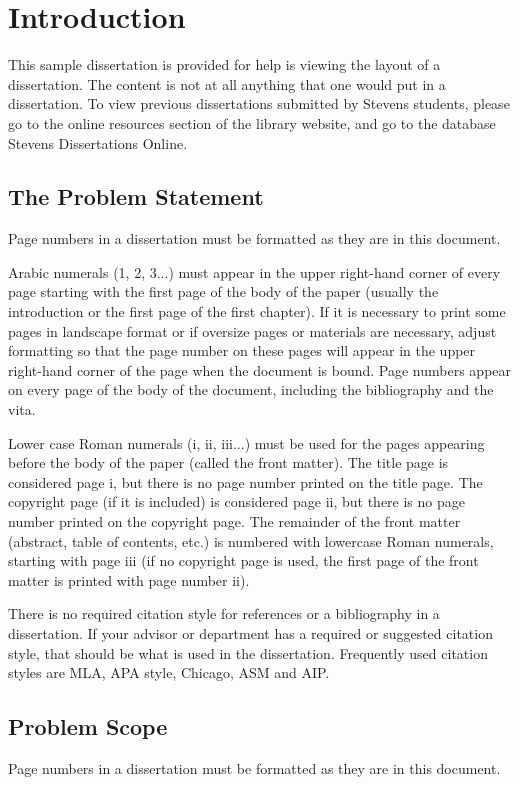 
\chapter{Introduction}
This sample dissertation is provided for help is viewing the layout of a dissertation.  The content is not at all anything that one would put in a dissertation.  To view previous dissertations submitted by Stevens students, please go to the online resources section of the library website, and go to the database Stevens Dissertations Online.  

\section{The Problem Statement}    
Page numbers in a dissertation must be formatted as they are in this document.  

Arabic numerals (1, 2, 3...) must appear in the upper right-hand corner of every page starting with the first page of the body of the paper (usually the introduction or the first page of the first chapter). If it is necessary to print some pages in landscape format or if oversize pages or materials are necessary, adjust formatting so that the page number on these pages will appear in the upper right-hand corner of the page when the document is bound. Page numbers appear on every page of the body of the document, including the bibliography and the vita.

Lower case Roman numerals (i, ii, iii...) must be used for the pages appearing before the body of the paper (called the front matter). The title page is considered page i, but there is no page number printed on the title page. The copyright page (if it is included) is considered page ii, but there is no page number printed on the copyright page. The remainder of the front matter (abstract, table of contents, etc.) is numbered with lowercase Roman numerals, starting with page iii (if no copyright page is used, the first page of the front matter is printed with page number ii). 

There is no required citation style for references or a bibliography in a dissertation.  If your advisor or department has a required or suggested citation style, that should be what is used in the dissertation.  Frequently used citation styles are MLA\cite{gibaldi_mla}, APA style\cite{APA}, Chicago, ASM and AIP.    

\section{Problem Scope}
Page numbers in a dissertation must be formatted as they are in this document.  

